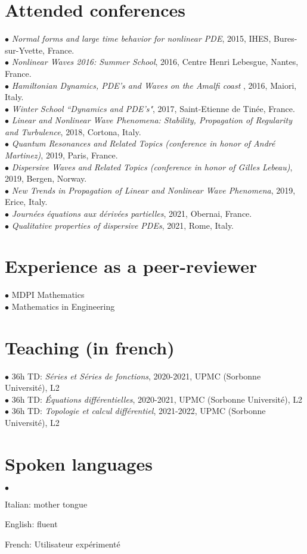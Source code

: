 \documentclass[margin,line,pifont,palatino,courier]{res}
\newenvironment{list2}{
  \begin{list}{$\bullet$}{%
      \setlength{\itemsep}{0in}
      \setlength{\parsep}{0in} \setlength{\parskip}{0in}
      \setlength{\topsep}{0in} \setlength{\partopsep}{0in}
      \setlength{\leftmargin}{0.2in}}}{\end{list}}
\begin{document}
\begin{resume}
\section{\sc Attended conferences \\}
 $\bullet$ \emph{Normal forms and large time behavior for nonlinear PDE}, 2015, IHES, Bures-sur-Yvette, France.  \\
 $\bullet$  \emph{Nonlinear Waves 2016: Summer School}, 2016, Centre Henri Lebesgue, Nantes, France.  \\
$\bullet$ \emph{Hamiltonian Dynamics, PDE's and Waves on the Amalfi coast
}, 2016, Maiori, Italy. \\
$\bullet$ \emph{Winter School ``Dynamics and PDE's"}, 2017, Saint-Etienne de Tin\'ee, France. \\
$\bullet$ \emph{Linear and Nonlinear Wave Phenomena: Stability, Propagation of Regularity and Turbulence}, 2018, Cortona, Italy.\\
$\bullet$ \emph{Quantum Resonances and Related Topics (conference in honor of Andr\'e Martinez)}, 2019, Paris, France. \\
$\bullet$ \emph{Dispersive Waves and Related Topics (conference in honor of Gilles Lebeau)}, 2019, Bergen, Norway.\\
$\bullet$ \emph{New Trends in Propagation of Linear and Nonlinear Wave Phenomena}, 2019, Erice, Italy. \\
$\bullet$ \emph{Journ\'ees \'equations aux d\'eriv\'ees partielles}, 2021, Obernai, France.\\
$\bullet$ \emph{Qualitative properties of dispersive PDEs}, 2021, Rome, Italy.\\

\section{\sc Experience as a peer-reviewer} 
$\bullet$ MDPI Mathematics\\
$\bullet$ Mathematics in Engineering 

\section{\sc Teaching (in french)} $\bullet$ 36h TD: \emph{S\'eries et S\'eries de fonctions}, 2020-2021, UPMC (Sorbonne Universit\'e), L2\\
$\bullet$ 36h TD: \emph{\'Equations diff\'erentielles}, 2020-2021, UPMC (Sorbonne Universit\'e), L2\\
$\bullet$ 36h TD: \emph{Topologie et calcul diff\'erentiel}, 2021-2022, UPMC (Sorbonne Universit\'e), L2\\


\section{\sc Spoken languages} \begin{list2}
\vspace*{.05in}
\item  Italian: mother tongue
\item English: fluent
\item French: Utilisateur exp\'eriment\'e
\end{list2}




\end{resume}
\end{document}
